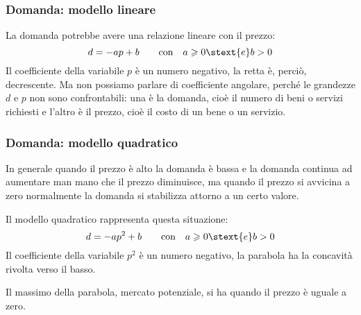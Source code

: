 \subsubsection{Domanda: modello lineare}

La domanda potrebbe avere una relazione lineare con il prezzo:
\[d= -ap+b \qquad \text{con} \quad a \geqslant 0 \stext{ e } b > 0\]
Il coefficiente della variabile \(p\) è un numero negativo, la retta è, 
perciò, decrescente. 
Ma non possiamo parlare di coefficiente angolare, perché le 
grandezze \(d\) e \(p\) non sono confrontabili: una è la domanda, cioè il 
numero di beni o servizi richiesti e l'altro è il prezzo,  cioè il costo di 
un bene o un servizio.


\subsubsection{Domanda: modello quadratico}

In generale quando il prezzo è alto la domanda è bassa e la domanda continua 
ad aumentare man mano che il prezzo diminuisce, ma quando il prezzo si 
avvicina a zero normalmente la domanda si stabilizza attorno a un certo 
valore.

Il modello quadratico rappresenta questa situazione:
\[d= -ap^2+b \qquad \text{con} \quad a \geqslant 0 \stext{ e } b > 0\]
Il coefficiente della variabile \(p^2\) è un numero negativo, la parabola ha 
la concavità rivolta verso il basso. 

Il massimo della parabola, mercato potenziale, si ha quando il prezzo è 
uguale a zero.


